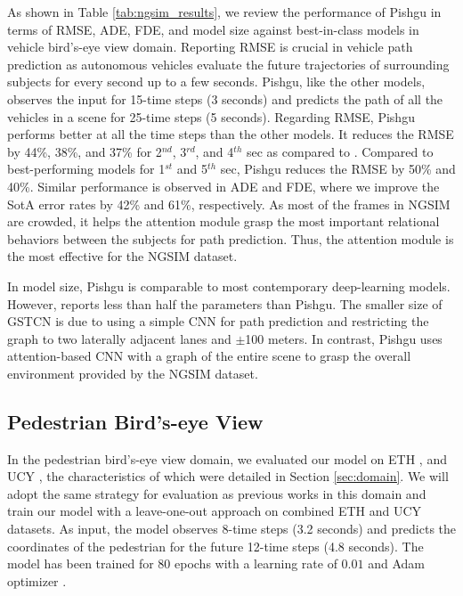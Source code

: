 \documentclass[sigconf]{acmart}
\begin{document}
As shown in Table \ref{tab:ngsim_results}, we review the performance of Pishgu in terms of RMSE, ADE, FDE, and model size against best-in-class models \cite{CSlstm18, katariya2021deeptrack, 2020gripplus, Pip2021, GSTCN2022, STALSTM2021} in vehicle bird's-eye view domain. Reporting RMSE is crucial in vehicle path prediction as autonomous vehicles evaluate the future trajectories of surrounding subjects for every second up to a few seconds. Pishgu, like the other models, observes the input for 15-time steps (3 seconds) and predicts the path of all the vehicles in a scene for 25-time steps (5 seconds). Regarding RMSE, Pishgu performs better at all the time steps than the other models. It reduces the RMSE by 44\%, 38\%, and 37\% for 2$^{nd}$, 3$^{rd}$, and 4$^{th}$ sec as compared to \cite{GSTCN2022}. Compared to best-performing models for 1$^{st}$ and 5$^{th}$ sec, Pishgu reduces the RMSE by 50\% and 40\%. Similar performance is observed in ADE and FDE, where we improve the SotA error rates by 42\% and 61\%, respectively. As most of the frames in NGSIM are crowded, it helps the attention module grasp the most important relational behaviors between the subjects for path prediction. Thus, the attention module is the most effective for the NGSIM dataset.

In model size, Pishgu is comparable to most contemporary deep-learning models. However, \cite{GSTCN2022} reports less than half the parameters than Pishgu. The smaller size of GSTCN is due to using a simple CNN for path prediction and restricting the graph to two laterally adjacent lanes and $\pm$100 meters. In contrast, Pishgu uses attention-based CNN with a graph of the entire scene to grasp the overall environment provided by the NGSIM dataset.



\subsection{Pedestrian Bird's-eye View}


In the pedestrian bird's-eye view domain, we evaluated our model on ETH \cite{pellegrini2009you}, and UCY \cite{lerner2007crowds}, the characteristics of which were detailed in Section \ref{sec:domain}. We will adopt the same strategy for evaluation as previous works in this domain \cite{gupta2018social} and train our model with a leave-one-out approach on combined ETH and UCY datasets. As input, the model observes 8-time steps (3.2 seconds) and predicts the coordinates of the pedestrian for the future 12-time steps (4.8 seconds). The model has been trained for 80 epochs with a learning rate of $0.01$ and Adam optimizer \cite{kingma2014adam}.
\end{document}
